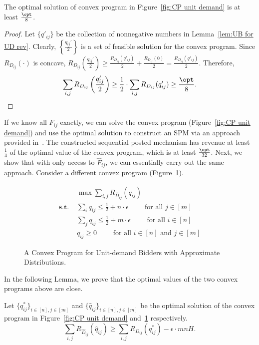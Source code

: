 \begin{lemma}\label{lem:compare exact CP with opt}
	The optimal solution of convex program in Figure~\ref{fig:CP unit demand} is at least $\frac{\opt}{8}$.
\end{lemma}
\begin{proof}
	Let $\{q'_{ij}\}$ be the collection of nonnegative numbers in Lemma~\ref{lem:UB for UD rev}. Clearly, $\left\{\frac{q_{ij}'}{2}\right\}$ is a set of feasible solution for the convex program. Since $R_{D_{ij}}(\cdot)$ is concave, $R_{D_{ij}}\left(\frac{q_{ij}'}{2}\right)\geq \frac{R_{D_{ij}}(q'_{ij})}{2} + \frac{R_{D_{ij}}(0)}{2}=\frac{R_{D_{ij}}(q'_{ij})}{2}$. Therefore, $$\sum_{i,j} R_{D_{ij}}\left(\frac{q_{ij}'}{2}\right)\geq 
	\frac{1}{2}\cdot \sum_{i,j} R_{D_{ij}}(q'_{ij})\geq \frac{\opt}{8}.$$
\end{proof}

If we know all $F_{ij}$ exactly, we can solve the convex program (Figure~\ref{fig:CP unit demand}) and use the optimal solution to construct an SPM via an approach provided in~\cite{ChawlaHMS10,CaiDW16}. The constructed sequential posted mechanism has revenue at least $\frac{1}{4}$ of the optimal value of the convex program, which is at least $\frac{\opt}{32}$. Next, we show that with only access to $\hat{F}_{ij}$, we can essentially carry out the same approach. Consider a different convex program (Figure~\ref{fig:CP unit demand approximate dist}).
\begin{figure}[ht]
\begin{minipage}{\textwidth} 
\begin{align*}
&\max \sum_{i,j} R_{\hat{D}_{ij}}(q_{ij})\\
\textbf{s.t. }& \sum_i q_{ij}\leq \frac{1}{2} + n\cdot\epsilon\qquad \text{ for all $j\in[m]$}\\
& \sum_j q_{ij}\leq \frac{1}{2}+m\cdot\epsilon \qquad \text{ for all $i\in[n]$}\\
& q_{ij}\geq 0\qquad \text{ for all $i\in[n]$ and $j\in[m]$}
\end{align*}
\end{minipage}
\caption{A Convex Program for Unit-demand Bidders with Approximate Distributions.}
\label{fig:CP unit demand approximate dist}
\end{figure}

In the following Lemma, we prove that the optimal values of the two convex programs above are close. 
\begin{lemma}\label{lem:UD compare the two CP}
	Let $\{{q}^*_{ij}\}_{i\in[n],j\in[m]}$ and $\{\hat{q}_{ij}\}_{i\in[n],j\in[m]}$ be the optimal solution of the convex program in Figure~\ref{fig:CP unit demand} and~\ref{fig:CP unit demand approximate dist} respectively.	$$\sum_{i,j}R_{\hat{D}_{ij}}(\hat{q}_{ij})\geq \sum_{i,j}{R}_{D_{ij}}({q}^*_{ij})-\epsilon\cdot mn H.$$
	\end{lemma}

